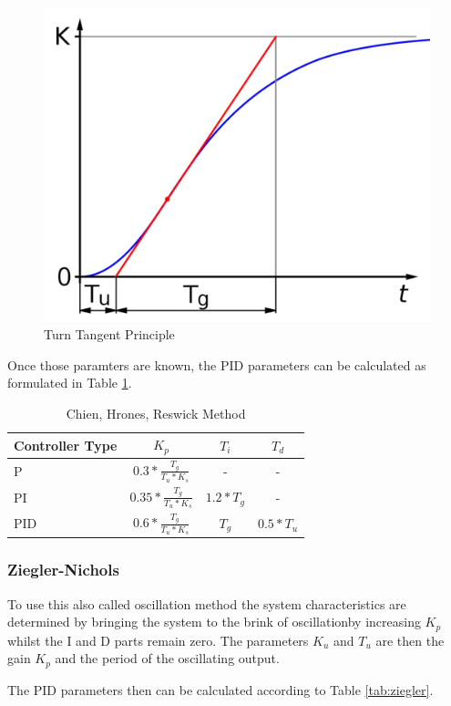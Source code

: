 \begin{figure}[H]
\begin{center}
\includegraphics[width=0.5\linewidth]{images/general/wendetangentenverfahren}
\end{center}
\caption{Turn Tangent Principle}
\label{fig:wendetangentenverfahren}
\end{figure}

Once those paramters are known, the PID parameters can be calculated as formulated in Table \ref{tab:chien}.

\begin{table}[H]
\begin{center}
\begin{tabular}{ l | c | c | c}
  Controller Type & $K_p$ & $T_i$ & $T_d$\\
  \hline
  \hline
  P & $0.3 * \frac{T_g}{T_u * K_s}$& - & -\\
  \hline
  PI & $0.35 * \frac{T_g}{T_u * K_s}$ & $1.2 * T_g$ & - \\
  \hline
  PID & $0.6 * \frac{T_g}{T_u * K_s}$ & $T_g$ & $0.5 * T_u$\\
  \hline
\end{tabular}
\end{center}
\caption{Chien, Hrones, Reswick Method}
\label{tab:chien}
\end{table}

\subsubsection{Ziegler-Nichols}
\label{subs:Ziegler-Nichols}

To use this also called oscillation method the system characteristics are determined by bringing the system to the brink of oscillationby increasing $K_p$ whilst the I and D parts remain zero. The parameters $K_u$ and $T_u$ are then the gain $K_p$ and the period of the oscillating output.

The PID parameters then can be calculated according to Table \ref{tab:ziegler}.

